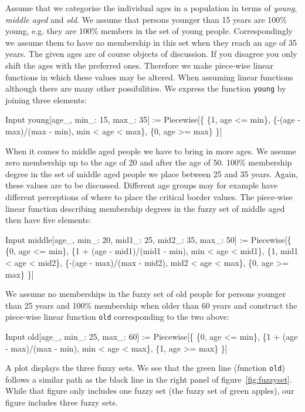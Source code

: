 \documentclass[11pt,fleqn]{book} %
\begin{document}
\begin{theorem}
\hfill \break
Assume that we categorise the individual ages in a population in terms of \textit{young}, \textit{middle aged} and \textit{old}. We assume that persons younger than 15 years are 100\% young, e.g. they are 100\% members in the set of young people. Correspondingly we assume them to have no membership in this set when they reach an age of 35 years. The given ages are of course objects of discussion. If you disagree you only shift the ages with the preferred ones. Therefore we make piece-wise linear functions in which these values may be altered. When assuming linear functions although there are many other possibilities. We express the function \texttt{young} by joining three elements:
\begin{mmaCell}[index=1]{Input}
  young[age_, min_: 15, max_: 35] := 
    Piecewise[\{
     \{1, age <= min\},
     \{-(age - max)/(max - min), min < age < max\},
     \{0, age >= max\}
    \}]
\end{mmaCell}
When it comes to middle aged people we have to bring in more ages. We assume zero membership up to the age of 20 and after the age of 50. 100\% membership degree in the set of middle aged people we place between 25 and 35 years. Again, these values are to be discussed. Different age groups may for example have different perceptions of where to place the critical border values. The piece-wise linear function describing membership degrees in the fuzzy set of middle aged then have five elements:
\begin{mmaCell}{Input}
  middle[age_, min_: 20, mid1_: 25, mid2_: 35, max_: 50] := 
    Piecewise[\{
     \{0, age <= min\},
     \{1 + (age - mid1)/(mid1 - min), min < age < mid1\},
     \{1, mid1 < age < mid2\},
     \{-(age - max)/(max - mid2), mid2 < age < max\},
     \{0, age >= max\}
    \}]
\end{mmaCell}
We assume no memberships in the fuzzy set of old people for persons younger than 25 years and 100\% membership when older than 60 years and construct the piece-wise linear function \texttt{old} corresponding to the two above:
\begin{mmaCell}{Input}
  old[age_, min_: 25, max_: 60] := 
    Piecewise[\{
     \{0, age <= min\},
     \{1 + (age - max)/(max - min), min < age < max\},
     \{1, age >= max\}
    \}]
\end{mmaCell}
A plot displays the three fuzzy sets. We see that the green line (function \texttt{old}) follows a similar path as the black line in the right panel of figure~\ref{fig:fuzzyset}. While that figure only includes one fuzzy set (the fuzzy set of green apples), our figure includes three fuzzy sets.

\end{theorem}
\end{document}
